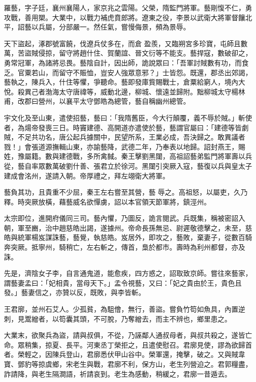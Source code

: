 \begin{pinyinscope}
 羅藝，字子廷，襄州襄陽人，家京兆之雲陽。父榮，隋監門將軍。藝剛愎不仁，勇攻戰，善用槊。大業中，以戰力補虎賁郎將。遼東之役，李景以武衛大將軍督饟北平，詔藝以兵屬，分部嚴一。然任氣，嘗慢侮景，頻為景辱。


天下盜起，涿郡號富饒，伐遼兵仗多在，而倉
 盈羨，又臨朔宮多珍寶，屯師且數萬，苦盜賊侵掠，留守將趙什住、賀蘭誼、晉文衍等不能支。藝捍寇，數破卻之，勇常冠軍，為諸將忌畏。藝陰自計，因出師，詭說眾曰：「吾軍討賊數有功，而食乏。官粟若山，而留守不賑恤，豈安人強眾意邪？」士皆怨。既還，郡丞出郊謁，藝執之，陳兵入，什住等懼，爭聽命。藝即發庫貲賜戰士，倉粟給窮人，境內大悅。殺異己者渤海太守唐禕等，威動北邊，柳城、懷遠並歸附。黜柳城太守楊林甫，改郡曰營州，以襄平太守鄧皓為總管，藝自稱幽州總管。



 宇文化及至山東，遣使招藝，藝曰：「我隋舊臣，今大行顛覆，義不辱於賊。」斬使者，為煬帝發喪三日。時竇建德、高開道亦遣使於藝，藝謂官屬曰：「建德等皆劇賊，不足共功名，唐公起兵據關中，民望所系，王業必成，吾決歸之。敢異議者戮！」會張道源撫輯山東，亦諭藝降，武德二年，乃奉表以地歸。詔封燕王，賜姓，豫屬籍。數與建德戰，多所禽馘。秦王擊劉黑闥，高祖詔藝弟監門將軍壽以兵從，藝自率眾數萬破劉什善、張君立於徐河。黑闥引突厥入寇，藝復以兵與皇太子建成會洺州，遂請入朝。帝厚禮之，拜左翊衛大將軍。


藝負其功，且貴重不少屈，秦王左右嘗至其營，藝
 辱之。高祖怒，以屬吏，久乃釋。時突厥放橫，藉藝威名欲憚虜，詔以本官領天節軍將，鎮涇州。



 太宗即位，進開府儀同三司。藝內懼，乃圖反，詭言閱武。兵既集，稱被密詔入朝，軍至豳，治中趙慈皓出謁，遂據州。帝命長孫無忌、尉遲敬德擊之，未至，慈皓與統軍楊岌謀誅藝，藝覺，執慈皓。岌居外，即攻之，藝敗，棄妻子，從數百騎奔突厥。抵寧州，騎稍亡，左右斬之，傳首，梟於都市。壽時為利州都督，亦及誅。



 先是，濟陰女子李，自言通鬼道，能愈疾，四方惑之，詔取致京師。嘗往來藝家，謂藝妻孟曰：「妃相貴，當母天下。」孟令視藝，又曰：「妃之貴由於王，貴色且發。」藝妻信之，亦贊以反，既敗，與李皆斬。



 王君廓，並州石艾人。少孤貧，為駔儈，無行，善盜。嘗負竹笱如魚具，內置逆刺，見鬻繒者，以笱囊其頭，不可脫，乃奪繒去，而主不辨也，鄉里患之。



 大業末，欲聚兵為盜，請與叔俱，不從，乃誣鄰人通叔母者，與叔共殺之，遂皆亡命。眾稍集，掠夏、長平。河東丞丁榮拒之，且遣使慰召。君廓見使，謬為欲歸首者。榮輕之，因陳兵登山，君廓悉伏甲山谷中。榮軍還，掩擊，破之。又與賊韋寶、鄧豹等掠虞鄉，宋老生與戰，君廓不利，保方山，老生列營迫之。君郭糧盡，詐請降，與老生隔澗語，祈請哀到。老生為感動，稍緩之，君廓一昔遁去。




\end{pinyinscope}

